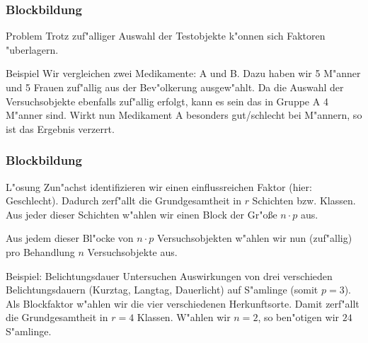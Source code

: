 \documentclass{beamer}
\begin{document}
\begin{frame}
  \frametitle{Blockbildung}
  \begin{alertblock}{Problem}
    Trotz zuf"alliger Auswahl der Testobjekte k"onnen sich Faktoren "uberlagern.    
  \end{alertblock}
  \pause
  \begin{exampleblock}{Beispiel}
    Wir vergleichen zwei Medikamente: A und B. Dazu haben wir 5 M"anner und 5 Frauen zuf"allig aus der Bev"olkerung ausgew"ahlt. Da die Auswahl der Versuchsobjekte ebenfalls zuf"allig erfolgt, kann es sein das in Gruppe A 4 M"anner sind. Wirkt nun Medikament A besonders gut/schlecht bei M"annern, so ist das Ergebnis verzerrt.    
  \end{exampleblock}
\end{frame}
\begin{frame}
  \frametitle{Blockbildung}
  \begin{block}{L"osung}
    Zun"achst identifizieren wir einen einflussreichen Faktor (hier: Geschlecht). Dadurch zerf"allt die Grundgesamtheit in $r$ Schichten bzw. Klassen. Aus jeder dieser Schichten w"ahlen wir einen Block der Gr"o{\ss}e $n\cdot p$ aus.  
  \end{block}
  \pause
  Aus jedem dieser Bl"ocke von $n\cdot p$ Versuchsobjekten w"ahlen wir nun (zuf"allig) pro Behandlung $n$ Versuchsobjekte aus.
  \pause
  \begin{exampleblock}{Beispiel: Belichtungsdauer} 
    Untersuchen Auswirkungen von drei verschieden Belichtungsdauern (Kurztag, Langtag, Dauerlicht) auf S"amlinge (somit $p = 3$). Als Blockfaktor w"ahlen wir die vier verschiedenen Herkunftsorte. Damit zerf"allt die Grundgesamtheit in $r = 4$ Klassen. W"ahlen wir $n=2$, so ben"otigen wir $24$ S"amlinge.
  \end{exampleblock}
\end{frame}
\end{document}
